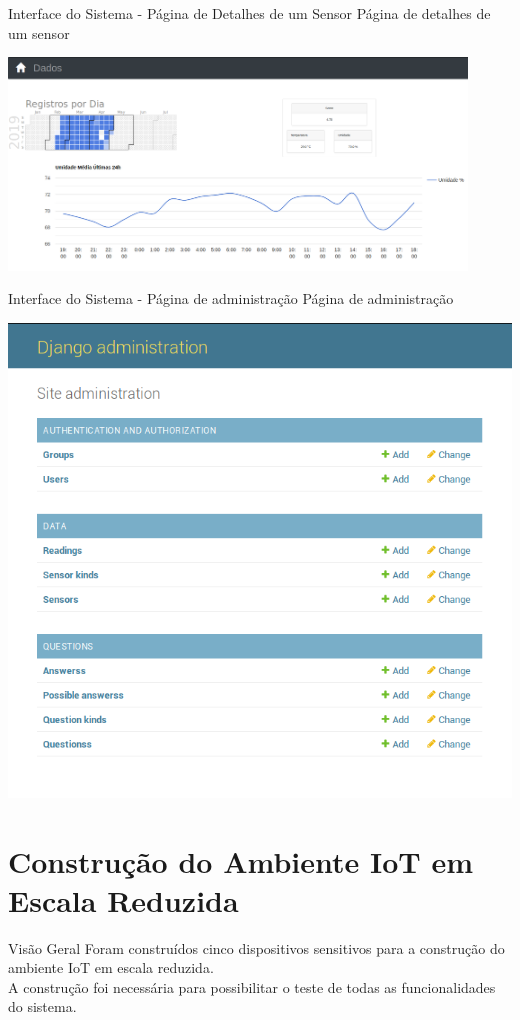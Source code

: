 \documentclass{beamer}
\begin{document}
  \begin{frame}{Interface do Sistema - Página de Detalhes de um Sensor}
    \quad Página de detalhes de um sensor
    \begin{center}
    \includegraphics[height=160pt, width=\textwidth]{pSensor}
    \end{center}
  \end{frame}
  \begin{frame}{Interface do Sistema - Página de administração}
    \quad Página de administração
    \begin{center}
    \includegraphics[scale=0.3]{admin}
    \end{center}
  \end{frame}

  \section{Construção do Ambiente IoT em Escala Reduzida}
    \begin{frame}{Visão Geral}
      \quad Foram construídos cinco dispositivos sensitivos para a construção do ambiente IoT em escala reduzida.
      \\\null \quad A construção foi necessária para possibilitar o teste de todas as funcionalidades do sistema.
    \end{frame}
\end{document}
